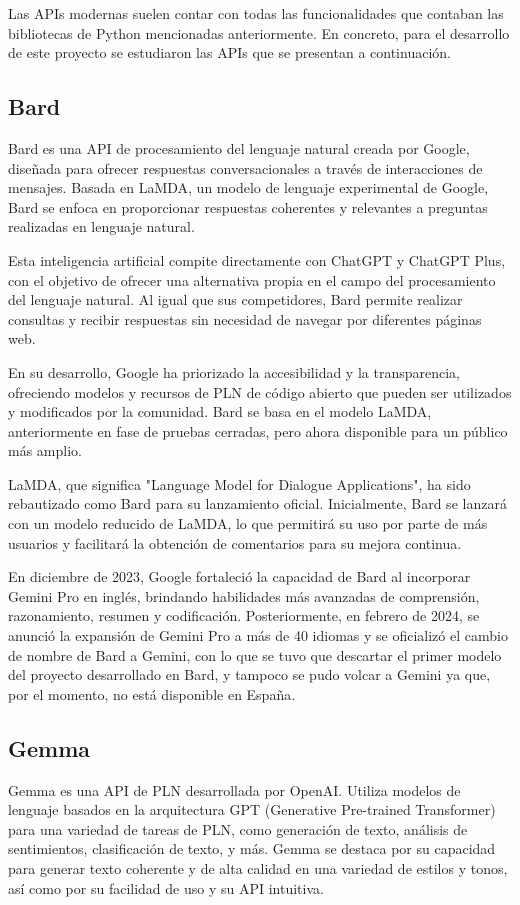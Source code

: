 Las APIs modernas suelen contar con todas las funcionalidades que contaban las bibliotecas de Python mencionadas anteriormente. En concreto, para el desarrollo de este proyecto se estudiaron las APIs que se presentan a continuación.
\subsection{Bard}
Bard es una API de procesamiento del lenguaje natural creada por Google, diseñada para ofrecer respuestas conversacionales a través de interacciones de mensajes. Basada en LaMDA, un modelo de lenguaje experimental de Google, Bard se enfoca en proporcionar respuestas coherentes y relevantes a preguntas realizadas en lenguaje natural.

Esta inteligencia artificial compite directamente con ChatGPT y ChatGPT Plus, con el objetivo de ofrecer una alternativa propia en el campo del procesamiento del lenguaje natural. Al igual que sus competidores, Bard permite realizar consultas y recibir respuestas sin necesidad de navegar por diferentes páginas web.

En su desarrollo, Google ha priorizado la accesibilidad y la transparencia, ofreciendo modelos y recursos de PLN de código abierto que pueden ser utilizados y modificados por la comunidad. Bard se basa en el modelo LaMDA, anteriormente en fase de pruebas cerradas, pero ahora disponible para un público más amplio.

LaMDA, que significa "Language Model for Dialogue Applications", ha sido rebautizado como Bard para su lanzamiento oficial. Inicialmente, Bard se lanzará con un modelo reducido de LaMDA, lo que permitirá su uso por parte de más usuarios y facilitará la obtención de comentarios para su mejora continua.

En diciembre de 2023, Google fortaleció la capacidad de Bard al incorporar Gemini Pro en inglés, brindando habilidades más avanzadas de comprensión, razonamiento, resumen y codificación. Posteriormente, en febrero de 2024, se anunció la expansión de Gemini Pro a más de 40 idiomas y se oficializó el cambio de nombre de Bard a Gemini, con lo que se tuvo que descartar el primer modelo del proyecto desarrollado en Bard, y tampoco se pudo volcar a Gemini ya que, por el momento, no está disponible en España. 
\subsection{Gemma}

Gemma es una API de PLN desarrollada por OpenAI. Utiliza modelos de lenguaje basados en la arquitectura GPT (Generative Pre-trained Transformer) para una variedad de tareas de PLN, como generación de texto, análisis de sentimientos, clasificación de texto, y más. Gemma se destaca por su capacidad para generar texto coherente y de alta calidad en una variedad de estilos y tonos, así como por su facilidad de uso y su API intuitiva.

